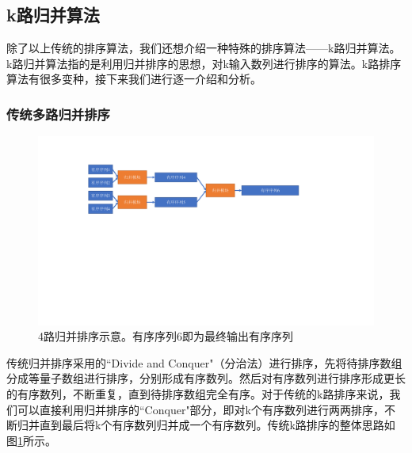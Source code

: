 \subsection{k路归并算法}
除了以上传统的排序算法，我们还想介绍一种特殊的排序算法——k路归并算法。k路归并算法指的是利用归并排序的思想，对k输入数列进行排序的算法。k路排序算法有很多变种，接下来我们进行逐一介绍和分析。
\subsubsection{传统多路归并排序}
\begin{figure}[htbp]
    \centering
    \includegraphics[width=\linewidth]{figures/traditional k way sort.pdf}
    \caption{4路归并排序示意。有序序列6即为最终输出有序序列}
    \label{fig:traditional_k_way_sort}
\end{figure}
传统归并排序采用的``Divide and Conquer"（分治法）进行排序，先将待排序数组分成等量子数组进行排序，分别形成有序数列。然后对有序数列进行排序形成更长的有序数列，不断重复，直到待排序数组完全有序。对于传统的k路排序来说，我们可以直接利用归并排序的``Conquer"部分，即对k个有序数列进行两两排序，不断归并直到最后将k个有序数列归并成一个有序数列。传统k路排序的整体思路如图\ref{fig:traditional_k_way_sort}所示。

